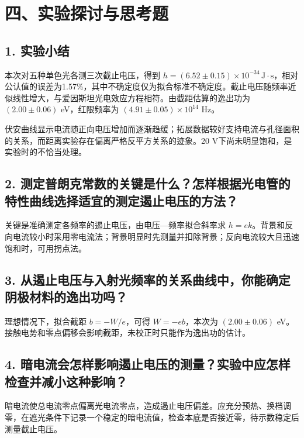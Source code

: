 \newpage
\section*{四、实验探讨与思考题}


\subsection*{1. 实验小结}

本次对五种单色光各测三次截止电压，得到 $h=(6.52\pm0.15)\times10^{-34}\,\mathrm{J\cdot s}$，相对公认值的误差为1.57\%，其中不确定度仅为拟合标准不确定度。截止电压随频率近似线性增大，与爱因斯坦光电效应方程相符。由截距估算的逸出功为 $(2.00\pm0.06)$ eV，红限频率为 $(4.91\pm0.05)\times10^{14}$ Hz。

伏安曲线显示电流随正向电压增加而逐渐趋缓；拓展数据较好支持电流与孔径面积的关系，而距离实验存在偏离严格反平方关系的迹象。20 V下尚未明显饱和，是实验时的不恰当处理。



\subsection*{2. 测定普朗克常数的关键是什么？怎样根据光电管的特性曲线选择适宜的测定遏止电压的方法？}

关键是准确测定各频率的遏止电压，由电压—频率拟合斜率求 $h=ek$。背景和反向电流较小时采用零电流法；背景明显时先测量并扣除背景；反向电流较大且迅速饱和时，可用拐点法。


\subsection*{3. 从遏止电压与入射光频率的关系曲线中，你能确定阴极材料的逸出功吗？}

理想情况下，拟合截距 $b=-W/e$，可得 $W=-eb$，本次为 $(2.00\pm0.06)$ eV。接触电势和零点偏移会影响截距，未校正时只能作为逸出功的估计。


\subsection*{4. 暗电流会怎样影响遏止电压的测量？实验中应怎样检查并减小这种影响？}

暗电流使总电流零点偏离光电流零点，造成遏止电压偏差。应充分预热、换档调零，在遮光条件下记录一个稳定的暗电流值，检查本底是否接近零，待示数稳定后测量截止电压。



